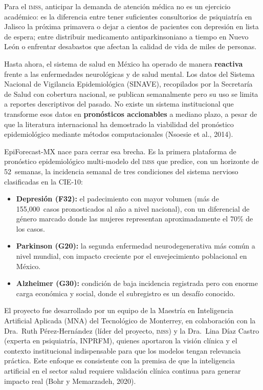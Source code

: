 \documentclass[12pt, letterpaper]{article}
\newcommand{\imss}{\textnormal{\textsc{imss}}}
\begin{document}
Para el \imss{}, anticipar la demanda de atención médica no es un ejercicio académico: es la diferencia entre tener suficientes consultorios de psiquiatría en Jalisco la próxima primavera o dejar a cientos de pacientes con depresión en lista de espera; entre distribuir medicamento antiparkinsoniano a tiempo en Nuevo León o enfrentar desabastos que afectan la calidad de vida de miles de personas.

Hasta ahora, el sistema de salud en México ha operado de manera \textbf{reactiva} frente a las enfermedades neurológicas y de salud mental. Los datos del Sistema Nacional de Vigilancia Epidemiológica (SINAVE), recopilados por la Secretaría de Salud con cobertura nacional, se publican semanalmente pero su uso se limita a reportes descriptivos del pasado. No existe un sistema institucional que transforme esos datos en \textbf{pronósticos accionables} a mediano plazo, a pesar de que la literatura internacional ha demostrado la viabilidad del pronóstico epidemiológico mediante métodos computacionales (Nsoesie et al., 2014).

EpiForecast-MX nace para cerrar esa brecha. Es la primera plataforma de pronóstico epidemiológico multi-modelo del \imss{} que predice, con un horizonte de 52~semanas, la incidencia semanal de tres condiciones del sistema nervioso clasificadas en la CIE-10:

\begin{itemize}
  \item \textbf{Depresión (F32):} el padecimiento con mayor volumen (más de 155,000~casos pronosticados al año a nivel nacional), con un diferencial de género marcado donde las mujeres representan aproximadamente el 70\% de los casos.
  \item \textbf{Parkinson (G20):} la segunda enfermedad neurodegenerativa más común a nivel mundial, con impacto creciente por el envejecimiento poblacional en México.
  \item \textbf{Alzheimer (G30):} condición de baja incidencia registrada pero con enorme carga económica y social, donde el subregistro es un desafío conocido.
\end{itemize}

El proyecto fue desarrollado por un equipo de la Maestría en Inteligencia Artificial Aplicada (MNA) del Tecnológico de Monterrey, en colaboración con la Dra.~Ruth Pérez-Hernández (líder del proyecto, \imss{}) y la Dra.~Lina Díaz Castro (experta en psiquiatría, INPRFM), quienes aportaron la visión clínica y el contexto institucional indispensable para que los modelos tengan relevancia práctica. Este enfoque es consistente con la premisa de que la inteligencia artificial en el sector salud requiere validación clínica continua para generar impacto real (Bohr y Memarzadeh, 2020).
\end{document}
